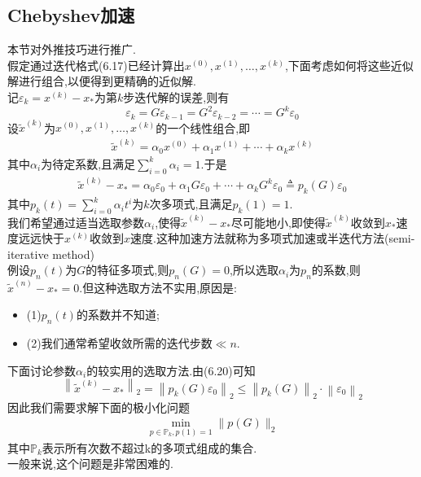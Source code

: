 \documentclass[12pt,a4paper]{article}
\begin{document}
\subsection{Chebyshev加速}
本节对外推技巧进行推广.\\
假定通过迭代格式(6.17)已经计算出$x^{(0)}, x^{(1)}, \ldots, x^{(k)}$,下面考虑如何将这些近似解进行组合,以便得到更精确的近似解.\\
记$\varepsilon_{k}=x^{(k)}-x_{*}$为第$k$步迭代解的误差,则有
$$
\varepsilon_{k}=G \varepsilon_{k-1}=G^{2} \varepsilon_{k-2}=\cdots=G^{k} \varepsilon_{0}
$$
设$\tilde{x}^{(k)}$为$x^{(0)}, x^{(1)}, \ldots, x^{(k)}$的一个线性组合,即
\begin{align*}
\tilde{x}^{(k)}=\alpha_{0} x^{(0)}+\alpha_{1} x^{(1)}+\cdots+\alpha_{k} x^{(k)}
\tag{6.19}
\end{align*}
其中$\alpha_{i}$为待定系数,且满足$\sum_{i=0}^{k} \alpha_{i}=1$.于是
\begin{align*}
\tilde{x}^{(k)}-x_{*}=\alpha_{0} \varepsilon_{0}+\alpha_{1} G \varepsilon_{0}+\cdots+\alpha_{k} G^{k} \varepsilon_{0} \triangleq p_{k}(G) \varepsilon_{0}
\tag{6.20}
\end{align*}
其中$p_{k}(t)=\sum_{i=0}^{k} \alpha_{i} t^{i}$为$k$次多项式,且满足$p_{k}(1)=1$.\\
我们希望通过适当选取参数$\alpha_i$,使得$\tilde{x}^{(k)}-x_*$尽可能地小,即使得$\tilde{x}^{(k)}$收敛到$x_*$速度远远快于$x^{(k)}$收敛到$x$速度.这种加速方法就称为{\color{blue}多项式加速}或{\color{blue}半迭代方法(semi-iterative method)}\\
{\color{blue}例}\qquad 设$p_{n}(t)$为$G$的特征多项式,则$p_{n}(G)=0$,所以选取$\alpha_i$为$p_n$的系数,则$\tilde{x}^{(n)}-x_{*}=0$.但这种选取方法不实用,原因是:
\begin{itemize}
\item (1)$p_{n}(t)$的系数并不知道;
\item (2)我们通常希望收敛所需的迭代步数$\ll n$.
\end{itemize}
下面讨论参数$\alpha_i$的较实用的选取方法.由(6.20)可知
$$\left\|\tilde{x}^{(k)}-x_{*}\right\|_{2}=\left\|p_{k}(G) \varepsilon_{0}\right\|_{2} \leq\left\|p_{k}(G)\right\|_{2} \cdot\left\|\varepsilon_{0}\right\|_{2}$$
因此我们需要求解下面的极小化问题
\begin{align*}
\min _{p \in \mathbb{P}_{k}, p(1)=1}\|p(G)\|_{2}
\tag{6.21}
\end{align*}
其中$\mathbb{P}_{k}$表示所有次数不超过k的多项式组成的集合.\\
一般来说,这个问题是非常困难的.\\
\end{document}
